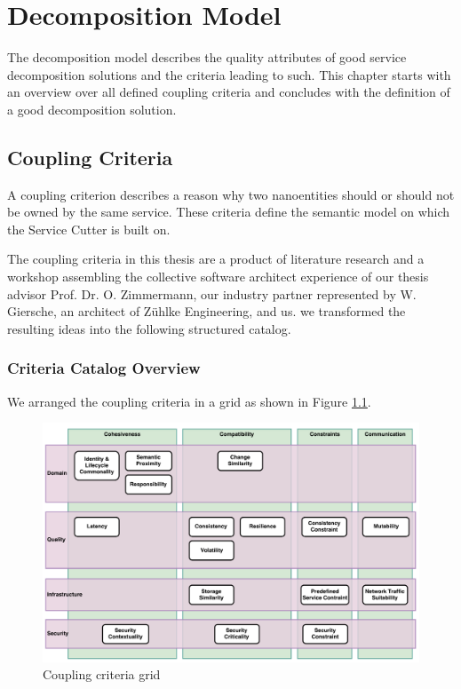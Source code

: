 \chapter{Decomposition Model}

The decomposition model describes the quality attributes of good service decomposition solutions and the criteria leading to such. This chapter starts with an overview over all defined coupling criteria and concludes with the definition of a good decomposition solution. 

\section{Coupling Criteria}
\label{sec:couplingCriteria}

A coupling criterion describes a reason why two nanoentities should or should not be owned by the same service. These criteria define the semantic model on which the Service Cutter is built on. 

The coupling criteria in this thesis are a product of literature research and a workshop assembling the collective software architect experience of our thesis advisor Prof. Dr. O. Zimmermann, our industry partner represented by W. Giersche, an architect of Zühlke Engineering, and us. we transformed the resulting ideas into the following structured catalog.

\subsection{Criteria Catalog Overview}
\label{subsec:couplingCriteriaOverview}

We arranged the coupling criteria in a grid as shown in Figure \ref{fig:cc_grid}.

\begin{figure}[H]
	\includegraphics[scale=0.5]{diagrams/CouplingCatalog.pdf}
	\caption{Coupling criteria grid}
	\label{fig:cc_grid}
\end{figure}

